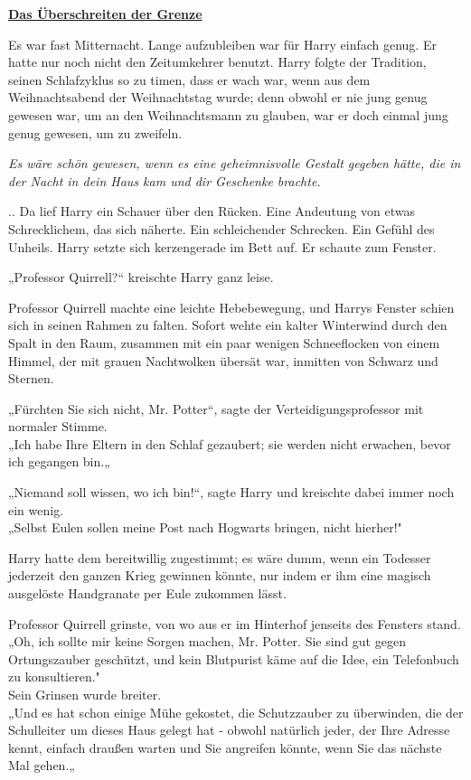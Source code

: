 

\hypertarget{das-uxfcberschreiten-der-grenze}{%

\textbf{\uline{Das Überschreiten der Grenze}}

\hfill\break Es war fast Mitternacht. Lange aufzubleiben war für Harry einfach genug. Er hatte nur noch nicht den Zeitumkehrer benutzt. Harry folgte der Tradition, seinen Schlafzyklus so zu timen, dass er wach war, wenn aus dem Weihnachtsabend der Weihnachtstag wurde; denn obwohl er nie jung genug gewesen war, um an den Weihnachtsmann zu glauben, war er doch einmal jung genug gewesen, um zu zweifeln.

\emph{Es wäre schön gewesen, wenn es eine geheimnisvolle Gestalt gegeben hätte, die in der Nacht in dein Haus kam und dir Geschenke brachte.}

.. Da lief Harry ein Schauer über den Rücken. Eine Andeutung von etwas Schrecklichem, das sich näherte. Ein schleichender Schrecken. Ein Gefühl des Unheils. Harry setzte sich kerzengerade im Bett auf. Er schaute zum Fenster.

„Professor Quirrell?“ kreischte Harry ganz leise.

Professor Quirrell machte eine leichte Hebebewegung, und Harrys Fenster schien sich in seinen Rahmen zu falten. Sofort wehte ein kalter Winterwind durch den Spalt in den Raum, zusammen mit ein paar wenigen Schneeflocken von einem Himmel, der mit grauen Nachtwolken übersät war, inmitten von Schwarz und Sternen.

„Fürchten Sie sich nicht, Mr. Potter“, sagte der Verteidigungsprofessor mit normaler Stimme.\\ „Ich habe Ihre Eltern in den Schlaf gezaubert; sie werden nicht erwachen, bevor ich gegangen bin.„

„Niemand soll wissen, wo ich bin!“, sagte Harry und kreischte dabei immer noch ein wenig.\\ „Selbst Eulen sollen meine Post nach Hogwarts bringen, nicht hierher!"

Harry hatte dem bereitwillig zugestimmt; es wäre dumm, wenn ein Todesser jederzeit den ganzen Krieg gewinnen könnte, nur indem er ihm eine magisch ausgelöste Handgranate per Eule zukommen lässt.

Professor Quirrell grinste, von wo aus er im Hinterhof jenseits des Fensters stand.\\ „Oh, ich sollte mir keine Sorgen machen, Mr. Potter. Sie sind gut gegen Ortungszauber geschützt, und kein Blutpurist käme auf die Idee, ein Telefonbuch zu konsultieren."\\ Sein Grinsen wurde breiter.\\ „Und es hat schon einige Mühe gekostet, die Schutzzauber zu überwinden, die der Schulleiter um dieses Haus gelegt hat - obwohl natürlich jeder, der Ihre Adresse kennt, einfach draußen warten und Sie angreifen könnte, wenn Sie das nächste Mal gehen.„

}
